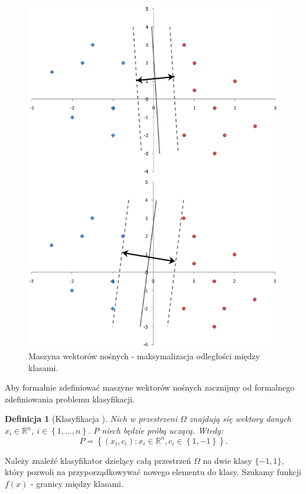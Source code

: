 \documentclass[12pt,a4paper]{report}
\newtheorem{df}{Definicja}[chapter]
\newcommand{\set}[1]{\left\lbrace {#1} \right\rbrace}
\newcommand{\setR}{\mathbb{R}}
\begin{document}
\begin{center}
\begin{figure}[H]
\centering
\includegraphics[scale=0.5]{SVM.PNG} 
\caption{Maszyna wektorów nośnych - maksymalizacja odległości między klasami.}
\end{figure}
\end{center}
Aby formalnie zdefiniować maszyne wektorów nośnych zacznijmy od formalnego zdefiniowania problemu klasyfikacji.
\begin{df}[Klasyfikacja {\citep{svmmwn}}]
Nich w przestrzeni $\Omega$ znajdują się wektory danych $x_i \in \setR^n$, $i\in \set{1,\ldots,n}$. $P$ niech będzie próbą uczącą.
Wtedy:
$$
P = \set{(x_i,c_i): x_i \in \setR^n, c_i \in \set{1,-1}}.
$$
\end{df}
Należy znaleźć klasyfikator dzielący całą przestrzeń $\Omega$ na dwie klasy $\{-1,1\}$, który pozwoli na przyporządkowywać nowego elementu do klasy. Szukamy funkcji $f(x)$ - granicy między klasami.
\end{document}
